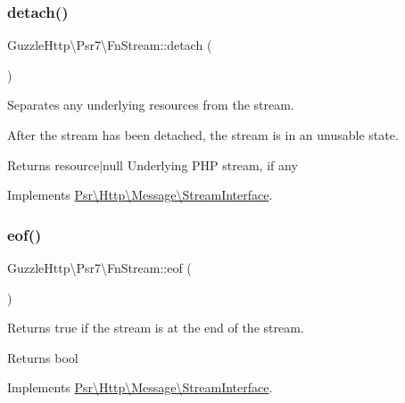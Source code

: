\subsubsection{\texorpdfstring{detach()}{detach()}}
{\footnotesize\ttfamily Guzzle\+Http\textbackslash{}\+Psr7\textbackslash{}\+Fn\+Stream\+::detach (\begin{DoxyParamCaption}{ }\end{DoxyParamCaption})}

Separates any underlying resources from the stream.

After the stream has been detached, the stream is in an unusable state.

\begin{DoxyReturn}{Returns}
resource$\vert$null Underlying P\+HP stream, if any 
\end{DoxyReturn}


Implements \hyperlink{interfacePsr_1_1Http_1_1Message_1_1StreamInterface_a1670dba880a8c14690746732960d4c9c}{Psr\textbackslash{}\+Http\textbackslash{}\+Message\textbackslash{}\+Stream\+Interface}.

\mbox{\label{classGuzzleHttp_1_1Psr7_1_1FnStream_a9e01510a73317b43ef96fdfc7cc7e1c8}} 
\subsubsection{\texorpdfstring{eof()}{eof()}}
{\footnotesize\ttfamily Guzzle\+Http\textbackslash{}\+Psr7\textbackslash{}\+Fn\+Stream\+::eof (\begin{DoxyParamCaption}{ }\end{DoxyParamCaption})}

Returns true if the stream is at the end of the stream.

\begin{DoxyReturn}{Returns}
bool 
\end{DoxyReturn}


Implements \hyperlink{interfacePsr_1_1Http_1_1Message_1_1StreamInterface_a502cc5ca370c6925b78d95d86d68777c}{Psr\textbackslash{}\+Http\textbackslash{}\+Message\textbackslash{}\+Stream\+Interface}.

\mbox{\label{classGuzzleHttp_1_1Psr7_1_1FnStream_addd020a7528c39a029acef51538c42ab}} 
